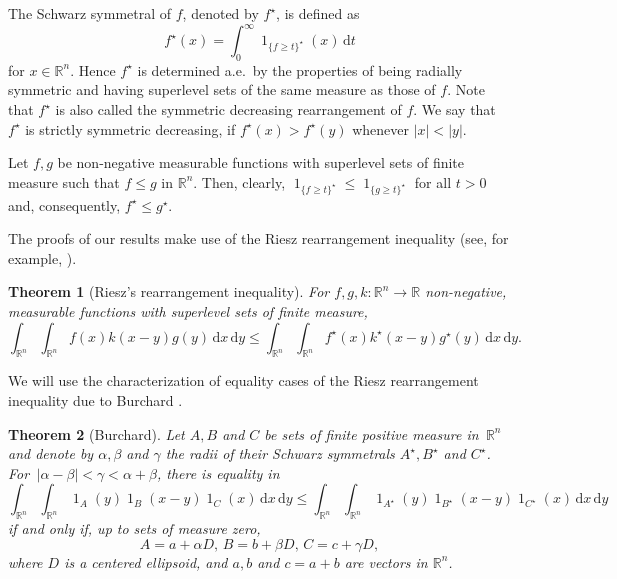 \documentclass{amsart}
\newtheorem{theorem}{Theorem}
\newcommand{\R}{\mathbb R}
\renewcommand{\d}{\,\mathrm{d}}
\renewcommand{\chi}{\operatorname{1}}
\begin{document}
The Schwarz symmetral of $f$, denoted by $f^\star$, is defined as
\begin{equation}\label{eq_layer_cake_schwarz}
f^\star(x) = \int_0^\infty \chi_{\{f\geq t\}^\star}(x) \d t
\end{equation}
for $x\in\R^n$.
Hence $f^\star$ is determined a.e.\ by the properties of being radially symmetric and having superlevel sets of the same measure as those of $f$. Note that $f^\star$ is also called the symmetric decreasing rearrangement of $f$. We say that $f^\star$ is strictly symmetric decreasing, if $f^\star(x)>f^\star(y)$ whenever $\vert x\vert <\vert y\vert$.

Let $f,g$ be non-negative measurable functions with superlevel sets of finite measure such that $f \leq g$ in $\R^n$. Then, clearly, $\chi_{\{f\geq t\}^\star} \leq \chi_{\{g\geq t\}^\star}$ for all $t>0$ and, consequently, $f^\star \leq g^\star$.

\goodbreak
The proofs of our results make use of the Riesz rearrangement inequality (see, for example, \cite[Theorem 3.7]{Lieb:Loss}). 

\begin{theorem}[Riesz's rearrangement inequality]
        \label{thm_BLL}
        For $f,g,k:\R^n \to \R$ non-negative, measurable functions with superlevel sets of finite measure,
         \[ \int_{\R^n}\int_{\R^n}  f(x) k(x-y) g(y) \d x \d y \leq \int_{\R^n}\int_{\R^n}  f^\star(x) k^\star(x-y) g^\star(y) \d x \d y. \]
\end{theorem}

\goodbreak
We will use the characterization of equality cases of the Riesz rearrangement inequality due to Burchard  \cite{Burchard96}.

\begin{theorem}[Burchard]
        \label{thm_burchard}
        Let $A,B$ and $C$ be sets of finite positive measure in $\,\R^n$ and denote by $\alpha, \beta$ and $\gamma$ the radii of their Schwarz symmetrals $A^\star, B^\star$ and $C^\star$.
        For $\,\vert\alpha - \beta\vert < \gamma < \alpha+\beta$, there is equality in
        \[ \int_{\R^n}\int_{\R^n} \chi_A(y) \chi_B(x-y) \chi_C(x) \d x \d y \leq  \int_{\R^n}\int_{\R^n} \chi_{A^\star}(y) \chi_{B^\star}(x-y) \chi_{C^\star}(x) \d x \d y \]
        if and only if, up to sets of measure zero,
        \[A=a+\alpha D,\, B = b+\beta D,\, C = c+\gamma D,\]
        where $D$ is a centered ellipsoid, and $a,b$ and $c=a+b$ are vectors in $\R^n$.
\end{theorem}
\end{document}
